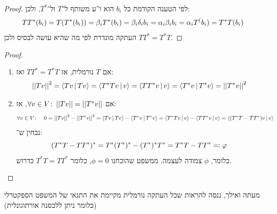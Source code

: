 \documentclass[name=רשימות אלגברה לינארית 2א]{../../../tex/classes/megasumPreamble}
\begin{document}
	 \begin{proof}
		לפי הטענה הקודמת כל $b_i$ הוא ו''ע משותף ל־$T$ ול־$T^*$, ולכן: 
		\[ TT^*(b_i) = T(T^*(b_i)) = \bg_i T^*(b_i) = \bg_i \dg_i b_i = \ag_i \bg_i b_i = \ag_i T^(b_i) = T^*T(b_i) \]
		העתקה מוגדרת לפי מה שהיא עושה לבסיס ולכן $TT^* = T^*T$. 
	\end{proof}
	\begin{proof}\,
		\begin{enumerate}
			\item[$\implies$] אם $T$ נורמלית, אז $TT^* = T^*T$ ואז: 
			\[ \norm{Tv}^2 = \mut{Tv}{Tv} = \mut{T^*Tv}{v} = \mut{TT^*v}{v} = \mut{T^*v}{T^*v} = \norm{T^*v}^2 \]
			\item[$\impliedby$] אם $\forall v \in V \co \norm{Tv} = \norm{T^*v}$, אז: 
			\begin{align*}
				\forall v \in V \co \quad 0 = \norm{Tv}^2 - \norm{T^*v}^2 = \mut{Tv}{Tv} - \mut{T^*v}{T^*v} = \mut{T^*Tv}{v} - \mut{TT^*v}{v} = \mut{(T^*T - TT^*)v}{v}
			\end{align*}
			נבחין ש־: 
			\[ (T^*T - TT^*)^* = T^*(T^*)^* - (T^*)^*T^* = T^*T - TT^* \doc \phi \]
			כלומר, $\phi$ צמודה לעצמה. ממשפט שהוכחנו $\phi = 0$, כלומר $T^*T = TT^*$ כדרוש. 
		\end{enumerate}\envendproof
	\end{proof}
	
	מעתה ואילך, ננסה להראות שכל העתקה נורמלית מקיימת את התנאי של המשפט הספקטרלי (כלומר ניתן ללכסנה אורתוגונלית)
	
\end{document}
